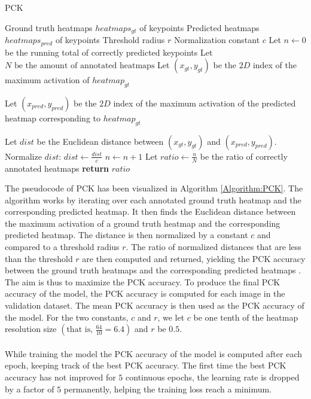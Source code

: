 \documentclass[./main.tex]{subfiles}
\begin{document}
\begin{algorithm}[t]
    \caption{PCK \cite{Camilla}\cite{SHG}}
    \label{Algorithm:PCK}
    \begin{algorithmic}[1]
        \Require Ground truth heatmaps $heatmaps_{gt}$ of keypoints
        \Require Predicted heatmaps $heatmaps_{pred}$ of keypoints
        \Require Threshold radius $r$
        \Require Normalization constant $c$
        \State Let $n \gets 0$ be the running total of correctly predicted keypoints
        \State Let $N \text{ be the amount of annotated heatmaps}$
            \State Let $(x_{gt}, y_{gt})$ be the $2D$ index of the maximum activation of $heatmap_{gt}$
            \State \begin{varwidth}[t]{\linewidth}
                Let $(x_{pred}, y_{pred})$ be the $2D$ index of the maximum activation of the predicted heatmap corresponding to $heatmap_{gt}$
            \end{varwidth}
            \State Let $dist$ be the Euclidean distance between $(x_{gt}, y_{gt})$ and $(x_{pred}, y_{pred})$.
            \State Normalize $dist$: $dist \gets \frac{dist}{c}$
                \State $n \gets n + 1$
            \EndIf
        \EndFor
        \State Let $ratio \gets \frac{n}{N}$ be the ratio of correctly annotated heatmaps
        \State \textbf{return} $ratio$
    \end{algorithmic}
\end{algorithm}
The pseudocode of PCK has been visualized in Algorithm \ref{Algorithm:PCK}. The algorithm works by iterating over each annotated ground truth heatmap and the corresponding predicted heatmap. It then finds the Euclidean distance between the maximum activation of a ground truth heatmap and the corresponding predicted heatmap. The distance is then normalized by a constant $c$ and compared to a threshold radius $r$. The ratio of normalized distances that are less than the threshold $r$ are then computed and returned, yielding the PCK accuracy between the ground truth heatmaps and the corresponding predicted heatmaps \cite{Camilla} \cite{SHG}. The aim is thus to maximize the PCK accuracy. To produce the final PCK accuracy of the model, the PCK accuracy is computed for each image in the validation dataset. The mean PCK accuracy is then used as the PCK accuracy of the model. For the two constants, $c$ and $r$, we let $c$ be one tenth of the heatmap resolution size $\left(\text{that is, }\frac{64}{10} = 6.4 \right)$ and $r$ be $0.5$.
\\
\\
While training the model the PCK accuracy of the model is computed after each epoch, keeping track of the best PCK accuracy. The first time the best PCK accuracy has not improved for $5$ continuous epochs, the learning rate is dropped by a factor of $5$ permanently, helping the training loss reach a minimum.
\end{document}

